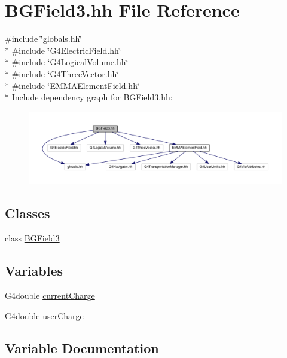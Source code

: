 \hypertarget{BGField3_8hh}{}\section{B\+G\+Field3.\+hh File Reference}
\label{BGField3_8hh}
{\ttfamily \#include \char`\"{}globals.\+hh\char`\"{}}\\*
{\ttfamily \#include \char`\"{}G4\+Electric\+Field.\+hh\char`\"{}}\\*
{\ttfamily \#include \char`\"{}G4\+Logical\+Volume.\+hh\char`\"{}}\\*
{\ttfamily \#include \char`\"{}G4\+Three\+Vector.\+hh\char`\"{}}\\*
{\ttfamily \#include \char`\"{}E\+M\+M\+A\+Element\+Field.\+hh\char`\"{}}\\*
Include dependency graph for B\+G\+Field3.\+hh\+:
\nopagebreak
\begin{figure}[H]
\begin{center}
\leavevmode
\includegraphics[width=350pt]{BGField3_8hh__incl}
\end{center}
\end{figure}
\subsection*{Classes}
\begin{DoxyCompactItemize}
\item 
class \hyperlink{classBGField3}{B\+G\+Field3}
\end{DoxyCompactItemize}
\subsection*{Variables}
\begin{DoxyCompactItemize}
\item 
G4double \hyperlink{BGField3_8hh_acb265d8eecfa1acd31056f0c7915362e}{current\+Charge}
\item 
G4double \hyperlink{BGField3_8hh_a2d61cdd1b1b5ed409f7c91b54737c1b9}{user\+Charge}
\end{DoxyCompactItemize}


\subsection{Variable Documentation}
